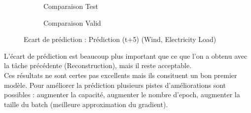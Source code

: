 \documentclass{article}
\begin{document}
\begin{figure}[H]
        \centering
        \begin{subfigure}[t]{0.49\textwidth}
            \caption{Comparaison Test}
        \end{subfigure}
        \hfill
        \begin{subfigure}[t]{0.49\textwidth}
        \caption{Comparaison Valid}
    \end{subfigure}
        \caption{Ecart de prédiction : Prédiction (t+5) (Wind, Electricity Load)}
        \label{fig:test}
    \end{figure}
L'écart de prédiction est beaucoup plus important que ce que l'on a obtenu avec la tâche précédente (Reconstruction), mais il reste acceptable.\\Ces résultats ne sont certes pas excellents mais ils consituent un bon premier modèle. Pour améliorer la prédiction plusieurs pistes d'améliorations sont possibles : augmenter la capacité, augmenter le nombre d'epoch, augmenter la taille du batch (meilleure approximation du gradient).
\end{document}
